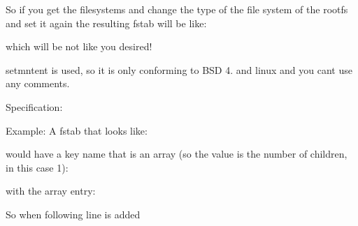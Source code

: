 So if you get the filesystems and change the type of the file system of the rootfs and set it again the resulting fstab will be like\+:


\begin{DoxyCode}{0}
\end{DoxyCode}


which will be not like you desired!

setmntent is used, so it is only conforming to B\+SD 4. and linux and you can\textquotesingle{}t use any comments.

Specification\+:


\begin{DoxyCode}{0}
\DoxyCodeLine{[/\_]}
\DoxyCodeLine{[/\_/\#]}
\DoxyCodeLine{[/\_/\#/device]}
\DoxyCodeLine{[/\_/\#/type]}
\DoxyCodeLine{[/\_/\#/options]}
\DoxyCodeLine{[/\_/\#/dumpfreq]}
\DoxyCodeLine{[/\_/\#/passno]}
\end{DoxyCode}


Example\+: A fstab that looks like\+:


\begin{DoxyCode}{0}
\end{DoxyCode}


would have a key name that is an array (so the value is the number of children, in this case 1)\+:


\begin{DoxyCode}{0}
\end{DoxyCode}


with the array entry\+:


\begin{DoxyCode}{0}
\end{DoxyCode}


So when following line is added


\begin{DoxyCode}{0}
\end{DoxyCode}


